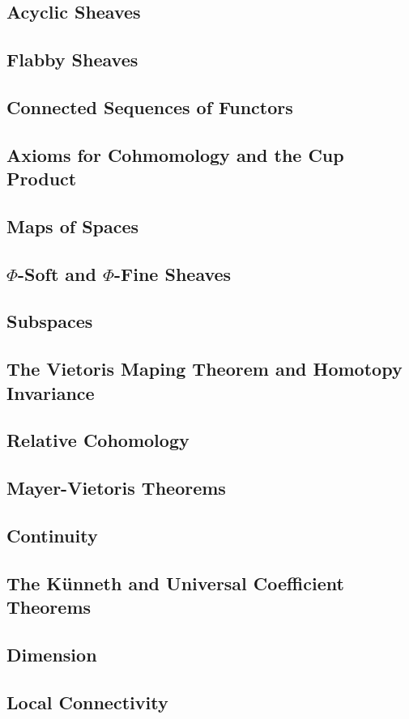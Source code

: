 \subsection{Acyclic Sheaves}
\subsection{Flabby Sheaves}
\subsection{Connected Sequences of Functors}
\subsection{Axioms for Cohmomology and the Cup Product}
\subsection{Maps of Spaces}
\subsection{$\Phi$-Soft and $\Phi$-Fine Sheaves}
\subsection{Subspaces}
\subsection{The Vietoris Maping Theorem and Homotopy Invariance}
\subsection{Relative Cohomology}
\subsection{Mayer-Vietoris Theorems}
\subsection{Continuity}
\subsection{The Künneth and Universal Coefficient Theorems}
\subsection{Dimension}
\subsection{Local Connectivity}
